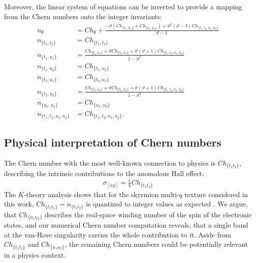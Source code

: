 \documentclass[submission, Phys]{SciPost}
\begin{document}
Moreover, the linear system of equations can be inverted to provide a mapping from the Chern numbers onto the integer invariants:
\begin{align}
       n_{\emptyset} &= Ch_{\emptyset} + \frac{-\vartheta (Ch_{\lbrace t_1, u_1\rbrace} + Ch_{\lbrace t_2, u_2 \rbrace}) + \vartheta^2(\vartheta-3)  Ch_{\lbrace t_1, t_2, u_1, u_2 \rbrace} }{\vartheta-1} \label{eq:Chernlabels1}
\\
n_{\lbrace t_1,t_2\rbrace} &= Ch_{\lbrace t_1,t_2 \rbrace} \label{eq:Chernlabels2}
\\
n_{\lbrace t_1, u_1 \rbrace} &=  \frac{Ch_{\lbrace t_1, u_1\rbrace} + \vartheta Ch_{\lbrace t_2, u_2 \rbrace} + \vartheta(\vartheta+1)  Ch_{\lbrace t_1, t_2, u_1, u_2 \rbrace} }{1-\vartheta^2} \label{eq:Chernlabels3}
\\
n_{\lbrace t_1,u_2\rbrace} &=  Ch_{\lbrace t_1, u_2 \rbrace} \label{eq:Chernlabels4}
\\
n_{\lbrace t_2,u_1\rbrace}  &=  Ch_{\lbrace t_2, u_1 \rbrace} \label{eq:Chernlabels5}
\\
n_{\lbrace t_2 ,u_2 \rbrace} &=
\frac{Ch_{\lbrace t_2, u_2\rbrace} + \vartheta Ch_{\lbrace t_1, u_1 \rbrace} + \vartheta(\vartheta+1)  Ch_{\lbrace t_1, t_2, u_1, u_2 \rbrace} }{1-\vartheta^2} \label{eq:Chernlabels6}
\\
n_{\lbrace u_1 , u_2 \rbrace} &=  Ch_{\lbrace u_1 , u_2 \rbrace} \label{eq:Chernlabels7}
\\
 n_{\lbrace t_1, t_2, u_1, u_2 \rbrace} &=  Ch_{\lbrace t_1, t_2, u_1, u_2  \rbrace} .
\label{eq:Chernlabels8}
\end{align}

\subsection{Physical interpretation of Chern numbers}

The Chern number with the most well-known connection to physics is $Ch_{\lbrace t_1 t_2 \rbrace}$, describing the intrinsic contributions to the anomalous Hall effect:
\begin{align}
    \sigma_{[xy]} = \frac{e}{h}  Ch_{\lbrace t_1 t_2 \rbrace}
\end{align}
The $K$-theory analysis shows that for the skyrmion multi-$q$ texture considered in this work, $Ch_{\lbrace t_1 t_2 \rbrace} = n_{\lbrace t_1 t_2 \rbrace}$ is quantized to integer values as expected \cite{Hamamoto2015}.
We argue, that $Ch_{\lbrace u_1 u_2 \rbrace}$ describes the real-space winding number of the spin of the electronic states, and our numerical Chern number computation reveals, that a single band at the van-Hove singularity carries the whole contribution to it.
Aside from $Ch_{\lbrace t_1 t_2 \rbrace}$ and $Ch_{\lbrace u_1 u_2 \rbrace}$, the remaining Chern numbers could be potentially relevant in a physics context. 
\end{document}
